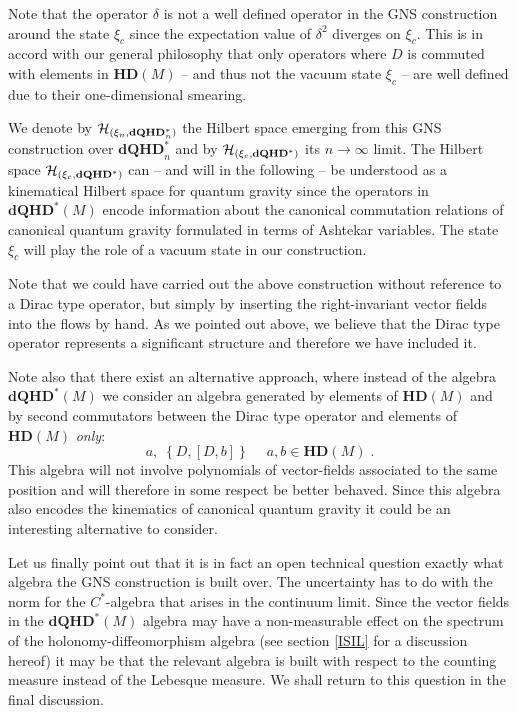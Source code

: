 \documentclass[12pt]{article}
\def\d{\delta}
\def\ch{{\cal H}}
\begin{document}
Note that the operator $\d$ is not a well defined operator in the GNS construction around the state $\xi_{c} $ since the expectation value of $\d^2$ diverges on $\xi_{c} $. This is in accord with our general philosophy that only operators where $D$ is commuted with elements in $\mathbf{HD}(M)$ -- and thus not the vacuum state $\xi_{c} $ -- are well defined due to their one-dimensional smearing.


We denote by $\ch_{(\xi_n,\mathbf{dQHD}^*_n)}$ the Hilbert space emerging from this GNS construction over $\mathbf{dQHD}^*_n$ and by $\ch_{(\xi_c,\mathbf{dQHD}^*)}$ its $n\rightarrow\infty$ limit. The Hilbert space $\ch_{(\xi_c,\mathbf{dQHD}^*)}$ can -- and will in the following -- be understood as a kinematical Hilbert space for quantum gravity since the operators in $\mathbf{dQHD}^*(M)$ encode information about the canonical commutation relations of canonical quantum gravity formulated in terms of Ashtekar variables.
%
%
The state $\xi_c$ will play the role of a vacuum state in our construction. %



Note that we could have carried out the above construction without reference to a Dirac type operator, but simply by inserting the right-invariant vector fields into the flows by hand. As we pointed out above, we believe that the Dirac type operator represents a significant structure and therefore we have included it.

Note also that there exist an alternative approach, where instead of the algebra $\mathbf{dQHD}^*(M)$ we consider an algebra generated by elements of $\mathbf{HD}(M)$ and by second commutators between the Dirac type operator and elements of $\mathbf{HD}(M)$ {\it only}:
$$
a,\;\left\{ D, \left[ D, b \right]\right\}   \;\quad a,b\in \mathbf{HD}(M)\;.
$$
 This algebra will not involve polynomials of vector-fields associated to the same position and will therefore in some respect be better behaved. Since this algebra also encodes the kinematics of canonical quantum gravity it could be an interesting alternative to consider.



Let us finally point out that it is in fact an open technical question exactly what algebra the GNS construction is built over. The uncertainty has to do with the norm for the $C^*$-algebra that arises in the continuum limit. Since the vector fields in the $\mathbf{dQHD}^*(M)$ algebra may have a non-measurable effect on the spectrum of the holonomy-diffeomorphism algebra (see section \ref{ISIL} for a discussion hereof) it may be that the relevant algebra is built with respect to the counting measure instead of the Lebesque measure. We shall return to this question in the final discussion.
\end{document}
